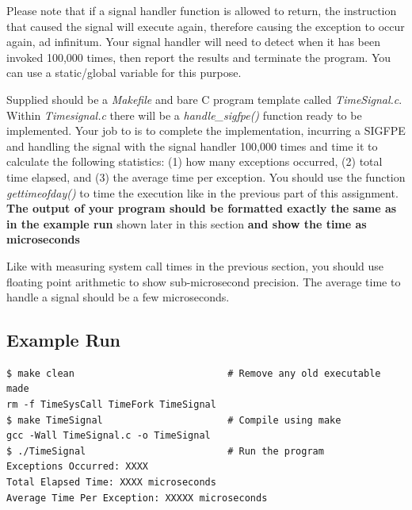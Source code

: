 \documentclass{article}
\begin{document}
\begin{info}
Please note that if a signal handler function is allowed to return, the instruction that caused the signal will execute again, therefore causing the exception to occur again, ad infinitum. Your signal handler will need to detect when it has been invoked 100,000 times, then report the results and terminate the program. You can use a static/global variable for this purpose.
\end{info}

Supplied should be a \textit{Makefile} and bare C program template called \textit{TimeSignal.c}. Within \textit{Timesignal.c} there will be a \textit{handle\_sigfpe()} function ready to be implemented. Your job to is to complete the implementation, incurring a SIGFPE and handling the signal with the signal handler 100,000 times and time it to calculate the following statistics: (1) how many exceptions occurred, (2) total time elapsed, and (3) the average time per exception. You should use the function \textit{gettimeofday()} to time the execution like in the previous part of this assignment. \textbf{The output of your program should be formatted exactly the same as in the example run} shown later in this section \textbf{and show the time as microseconds}\\

\begin{info}
Like with measuring system call times in the previous section, you should use floating point arithmetic to show sub-microsecond precision. The average time to handle a signal should be a few microseconds.
\end{info}

\subsection*{Example Run}
\begin{commandline}
\begin{verbatim}
$ make clean                           # Remove any old executable made
rm -f TimeSysCall TimeFork TimeSignal 
$ make TimeSignal                      # Compile using make
gcc -Wall TimeSignal.c -o TimeSignal
$ ./TimeSignal                         # Run the program
Exceptions Occurred: XXXX
Total Elapsed Time: XXXX microseconds
Average Time Per Exception: XXXXX microseconds
\end{verbatim}
\end{commandline}
\end{document}
